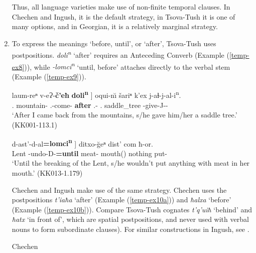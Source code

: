 \begin{enumerate}[label=\Roman*.]
Thus, all language varieties make use of non-finite temporal clauses. In Chechen and Ingush, it is the default strategy, in Tsova-Tush it is one of many options, and in Georgian, it is a relatively marginal strategy.

\item To express the meanings ‘before, until’, or ‘after’, Tsova-Tush uses postpositions. \textit{doli\textsuperscript{n}}  ‘after’ requires an Anteceding Converb (Example (\ref{temp-ex8})), while \textit{-lomci\textsuperscript{n}} ‘until, before’ attaches directly to the verbal stem (Example (\ref{temp-ex9})).


	\begin{exe}
		\ex\label{temp-ex8}
		\gll {{\normalfont[} as}	laum-reⁿ	v-eɁ-\textbf{č'eħ} {\textbf{doli\textsuperscript{n}} {\normalfont]}} oqui-n\u{\i}	šariⁿ	k'ex	j-aɬ-j-al-i\textsuperscript{n}.    \\
		{\Fsg}.{\Erg}	mountain-{\Abl}	{\M}.{\Sg}-come-\textbf{{\Ante}}	\textbf{after}	{\Dist}.{\Obl}-{\Dat}	{\Poss}.{\Refl}	saddle\_tree	{\J}-give-J-{\Intr}-{\Aor}   \\
		\trans `After I came back from the mountains, s/he gave him/her a saddle tree.’
		\hfill (KK001-113.1)
	\end{exe}



	\begin{exe}
		\ex\label{temp-ex9}
		\gll {{\normalfont[} marxv}	{d-ast'-d-al\textbf{=lomci\textsuperscript{n}} {\normalfont]}}	ditxo-\u{g}eⁿ	dist'	com	ħ-or.   \\
		Lent	{\D}-undo-D-{\Intr}\textbf{=until}	meat-{\Adjz}	mouth({\Lat})	nothing	put-{\Imprf}   \\
		\trans `Until the breaking of the Lent, s/he wouldn’t put anything with meat in her mouth.’
		\hfill (KK013-1.179)
	\end{exe}


Chechen and Ingush  make use of the same strategy. Chechen uses the postpositions \textit{t'iaħa} ‘after’ (Example (\ref{temp-ex10a})) and \textit{ħalxa} ‘before’ (Example (\ref{temp-ex10b})). Compare Tsova-Tush cognates \textit{t'q'uiħ} ‘behind’ and \textit{ħatx} ‘in front of’, which are spatial postpositions, and never used with verbal nouns to form subordinate clauses). For similar constructions in Ingush, see \textcite[607]{nichols11}.

\begin{exe}
	\ex\label{temp-ex10}
    	Chechen
    \begin{xlist}
	

\end{xlist}
\end{exe}
\end{enumerate}
